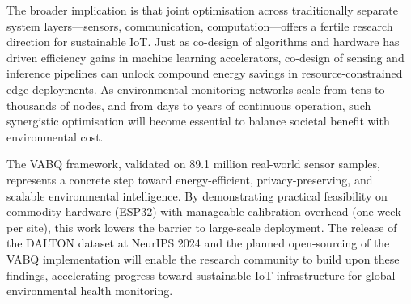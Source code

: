 The broader implication is that joint optimisation across traditionally separate system layers---sensors, communication, computation---offers a fertile research direction for sustainable IoT. Just as co-design of algorithms and hardware has driven efficiency gains in machine learning accelerators, co-design of sensing and inference pipelines can unlock compound energy savings in resource-constrained edge deployments. As environmental monitoring networks scale from tens to thousands of nodes, and from days to years of continuous operation, such synergistic optimisation will become essential to balance societal benefit with environmental cost.

The VABQ framework, validated on 89.1 million real-world sensor samples, represents a concrete step toward energy-efficient, privacy-preserving, and scalable environmental intelligence. By demonstrating practical feasibility on commodity hardware (ESP32) with manageable calibration overhead (one week per site), this work lowers the barrier to large-scale deployment. The release of the DALTON dataset at NeurIPS 2024 and the planned open-sourcing of the VABQ implementation will enable the research community to build upon these findings, accelerating progress toward sustainable IoT infrastructure for global environmental health monitoring.

